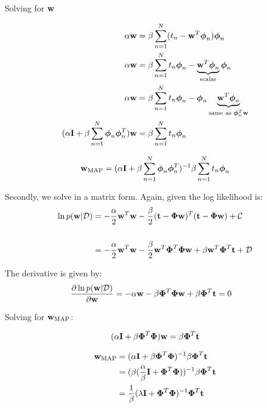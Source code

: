 \documentclass[12pt,a4paper]{article}
\newcommand{\Data}{\mathcal{D}}
\newcommand{\DataIndex}{n}
\newcommand{\eye}{{\bf I}}
\newcommand{\tscalar}{t}
\newcommand{\tvec}{{\bf \tscalar}}
\newcommand{\wscalar}{w}
\newcommand{\wvec}{{\bf \wscalar}}
\newcommand{\wvecMAP}{\wvec_{\text{MAP}}}
\newcommand{\tn}{\tscalar_{\DataIndex}}
\newcommand{\phivec}{\boldsymbol{\phi}}
\newcommand{\Phimat}{\boldsymbol{\Phi}}
\newcommand{\phivecn}{\phivec_{\DataIndex}}
\begin{document}
\begin{enumerate}
		  Solving for $\wvec$
		  
		  \begin{align*}
		  \alpha \wvec &= \beta \sum_{n=1}^{N} (\tn- \wvec^T \phivecn) \phivecn \\
		  \alpha \wvec &= \beta \sum_{n=1}^{N} \tn \phivecn - \underbrace{\wvec^T \phivecn}_{\text{scalar}} \phivecn \\
		  \alpha \wvec &= \beta \sum_{n=1}^{N} \tn \phivecn - \phivecn \underbrace{\wvec^T \phivecn}_{\text{same as } \phivecn^{T} \wvec} \\
		  (\alpha \eye + \beta \sum_{n=1}^{N} \phivecn\phivecn^T) \wvec &= \beta \sum_{n=1}^{N} \tn \phivecn 
		  \end{align*}
		  
		  \begin{align*}
		  \wvecMAP = (\alpha \eye + \beta \sum_{n=1}^{N} \phivecn\phivecn^T)^{-1} \beta \sum_{n=1}^{N} \tn \phivecn
		  \end{align*}
		  
		  Secondly, we solve in a matrix form. Again, given the log likelihood is: \\
		  
		  \begin{align*}
		  \ln{p(\wvec | \Data)} &= -\frac{\alpha}{2} \wvec^T \wvec - \frac{\beta}{2} (\tvec - \Phimat \wvec)^T (\tvec - \Phimat \wvec) + \mathcal{C} \\ \\
		  &= - \frac{\alpha}{2} \wvec^T\wvec - \frac{\beta}{2}\wvec^T \Phimat^T \Phimat \wvec + \beta \wvec^T \Phimat^T \tvec + \mathcal{D}
		  \end{align*}
		  
		  The derivative is given by: \\
		  
		  \begin{align*}
		  \frac{\partial \ln p(\wvec | \Data)}{\partial \wvec} &= - \alpha \wvec - \beta \Phimat^T \Phimat \wvec + \beta \Phimat^T \tvec = 0 
		  \end{align*}
		  
		  Solving for $\wvecMAP$:
		  
		  \begin{align*}
		  (\alpha \eye + \beta \Phimat^T \Phimat)\wvec = \beta \Phimat^T \tvec
		  \end{align*}
		  
		  \begin{align*}
		  \wvecMAP &= (\alpha \eye + \beta \Phimat^T \Phimat)^{-1} \beta \Phimat^T \tvec \\
		  &=(\beta (\frac{\alpha}{\beta} \eye + \Phimat^T\Phimat))^{-1} \beta \Phimat^T \tvec \\
		  &= \frac{1}{\beta}(\lambda \eye + \Phimat^T\Phimat)^{-1}\Phimat^T \tvec
		  \end{align*}
  

\end{enumerate}
\end{document}
